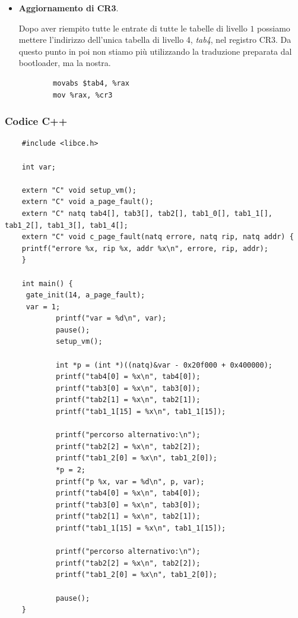 \documentclass[11pt]{report}
\theoremstyle{definition}
\begin{document}
\begin{itemize}
\begin{itemize}
	\end{itemize}
	\item \textbf{Aggiornamento di CR3}.
	
	Dopo aver riempito tutte le entrate di tutte le tabelle di livello $1$ possiamo mettere l'indirizzo dell'unica tabella di livello 4, \emph{tab4}, nel registro CR3. Da questo punto in poi non stiamo più utilizzando la traduzione preparata dal bootloader, ma la nostra.
	\begin{verbatim}
		movabs $tab4, %rax
		mov %rax, %cr3
	\end{verbatim}	
\end{itemize}
\normalsize 

\subsubsection{Codice C++} 
\small
\begin{verbatim}
	#include <libce.h>
	
	int var;
	
	extern "C" void setup_vm();
	extern "C" void a_page_fault();
	extern "C" natq tab4[], tab3[], tab2[], tab1_0[], tab1_1[], tab1_2[], tab1_3[], tab1_4[];
	extern "C" void c_page_fault(natq errore, natq rip, natq addr) {
    printf("errore %x, rip %x, addr %x\n", errore, rip, addr);
	}
	
	int main() {
     gate_init(14, a_page_fault);
     var = 1;
	    	printf("var = %d\n", var);
	    	pause();
	    	setup_vm();
	    	
	    	int *p = (int *)((natq)&var - 0x20f000 + 0x400000);
	    	printf("tab4[0] = %x\n", tab4[0]);
	    	printf("tab3[0] = %x\n", tab3[0]);
	    	printf("tab2[1] = %x\n", tab2[1]);
	    	printf("tab1_1[15] = %x\n", tab1_1[15]);
	    	
	    	printf("percorso alternativo:\n");
	    	printf("tab2[2] = %x\n", tab2[2]);
	    	printf("tab1_2[0] = %x\n", tab1_2[0]);
	    	*p = 2;
	    	printf("p %x, var = %d\n", p, var);
	    	printf("tab4[0] = %x\n", tab4[0]);
	    	printf("tab3[0] = %x\n", tab3[0]);
	    	printf("tab2[1] = %x\n", tab2[1]);
	    	printf("tab1_1[15] = %x\n", tab1_1[15]);
	    	
	    	printf("percorso alternativo:\n");
	    	printf("tab2[2] = %x\n", tab2[2]);
	    	printf("tab1_2[0] = %x\n", tab1_2[0]);
	    	
	    	pause();
	}
\end{verbatim}
\end{document}
